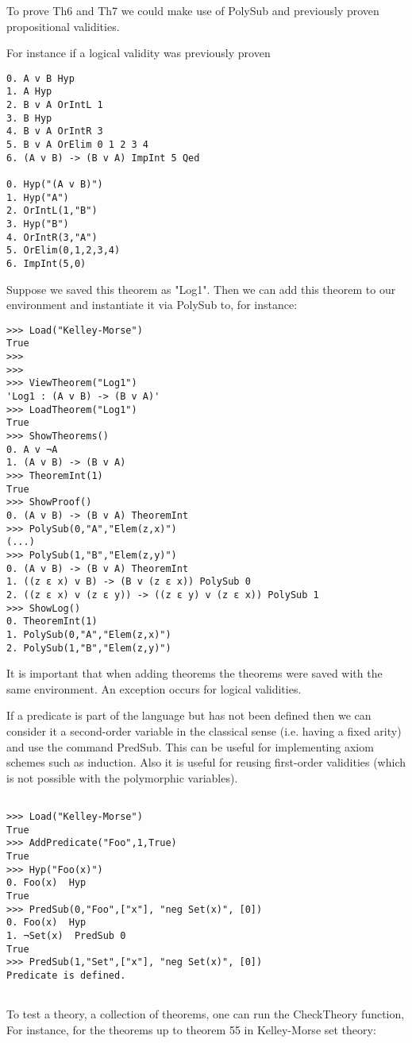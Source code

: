 \documentclass[a4paper,12pt,leqno]{article}
\numberwithin{equation}{section}
\begin{document}
To prove Th6 and Th7 we could make use of PolySub and previously proven propositional validities.

For instance if a logical validity was previously proven

\begin{verbatim}
0. A v B Hyp 
1. A Hyp 
2. B v A OrIntL 1
3. B Hyp 
4. B v A OrIntR 3
5. B v A OrElim 0 1 2 3 4
6. (A v B) -> (B v A) ImpInt 5 Qed

0. Hyp("(A v B)")
1. Hyp("A")
2. OrIntL(1,"B")
3. Hyp("B")
4. OrIntR(3,"A")
5. OrElim(0,1,2,3,4)
6. ImpInt(5,0)
\end{verbatim}

Suppose we saved this theorem as "Log1".
Then we can add this theorem to our environment
and instantiate it via PolySub to, for instance:

\begin{verbatim}
>>> Load("Kelley-Morse")
True
>>> 
>>> 
>>> ViewTheorem("Log1")
'Log1 : (A v B) -> (B v A)'
>>> LoadTheorem("Log1")
True
>>> ShowTheorems()
0. A v ¬A 
1. (A v B) -> (B v A) 
>>> TheoremInt(1)
True
>>> ShowProof()
0. (A v B) -> (B v A) TheoremInt 
>>> PolySub(0,"A","Elem(z,x)")
(...)
>>> PolySub(1,"B","Elem(z,y)")
0. (A v B) -> (B v A) TheoremInt 
1. ((z ε x) v B) -> (B v (z ε x)) PolySub 0
2. ((z ε x) v (z ε y)) -> ((z ε y) v (z ε x)) PolySub 1
>>> ShowLog()
0. TheoremInt(1)
1. PolySub(0,"A","Elem(z,x)")
2. PolySub(1,"B","Elem(z,y)")
\end{verbatim}
 It is important that when adding theorems the theorems were saved with the same environment. An exception occurs for logical validities.


If a predicate is part of the language but has not been defined then we can consider it a second-order variable in the classical sense (i.e. having a fixed arity) and
use the command PredSub. This can  be useful for implementing axiom schemes such as induction.  Also it is useful for reusing first-order validities (which is not possible with the polymorphic variables).

\begin{verbatim}
	
>>> Load("Kelley-Morse")
True
>>> AddPredicate("Foo",1,True)
True
>>> Hyp("Foo(x)")
0. Foo(x)  Hyp 
True
>>> PredSub(0,"Foo",["x"], "neg Set(x)", [0])
0. Foo(x)  Hyp 
1. ¬Set(x)  PredSub 0
True
>>> PredSub(1,"Set",["x"], "neg Set(x)", [0])
Predicate is defined.	
	
\end{verbatim}

To test a theory, a collection of theorems, one can run the CheckTheory function,
For instance, for the theorems up to theorem 55 in Kelley-Morse  set theory:
\end{document}
